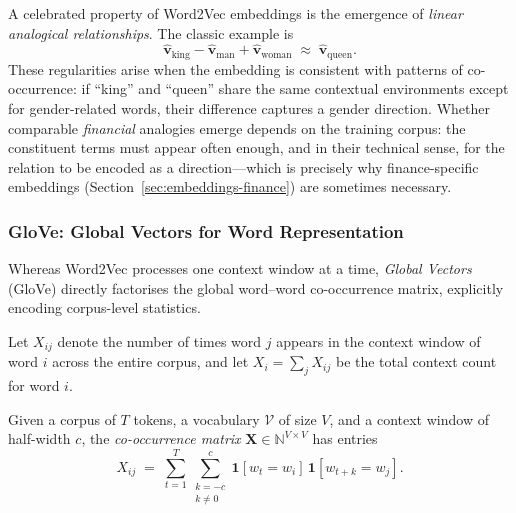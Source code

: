 \begin{deepdive}
A celebrated property of Word2Vec embeddings is the emergence of
\emph{linear analogical relationships}.  The classic example is
\begin{equation}
  \hat{\mathbf{v}}_{\text{king}}
  - \hat{\mathbf{v}}_{\text{man}}
  + \hat{\mathbf{v}}_{\text{woman}}
  \;\approx\;
  \hat{\mathbf{v}}_{\text{queen}}.
  \label{eq:analogy-royalty}
\end{equation}
These regularities arise when the embedding is
consistent with patterns of co-occurrence: if ``king'' and ``queen''
share the same contextual environments except for gender-related words,
their difference captures a gender direction.  Whether comparable
\emph{financial} analogies emerge depends on the training corpus: the
constituent terms must appear often enough, and in their technical sense,
for the relation to be encoded as a direction---which is precisely why
finance-specific embeddings (Section~\ref{sec:embeddings-finance}) are
sometimes necessary.

\subsubsection{GloVe: Global Vectors for Word Representation}

Whereas Word2Vec processes one context window at a time,
\emph{Global Vectors} (GloVe) \cite{pennington2014glove} %
directly factorises the global word--word co-occurrence matrix,
explicitly encoding corpus-level statistics.

Let $X_{ij}$ denote the number of times word $j$ appears in the
context window of word $i$ across the entire corpus, and let
$X_i = \sum_j X_{ij}$ be the total context count for word $i$.

\begin{definition}
\label{def:cooccurrence}
Given a corpus of $T$ tokens, a vocabulary $\mathcal{V}$ of size $V$,
and a context window of half-width $c$, the \emph{co-occurrence matrix}
$\mathbf{X} \in \mathbb{N}^{V \times V}$ has entries
\begin{equation}
  X_{ij}
  \;=\;
  \sum_{t=1}^{T}
  \sum_{\substack{k=-c \\ k \neq 0}}^{c}
  \mathbf{1}[w_t = w_i]\,\mathbf{1}[w_{t+k} = w_j].
  \label{eq:cooccurrence}
\end{equation}
\end{definition}


\end{deepdive}
